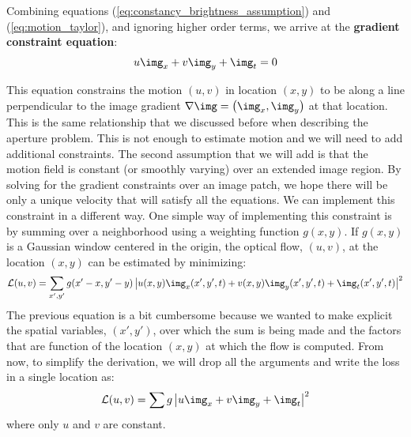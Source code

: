 Combining equations (\ref{eq:constancy_brightness_assumption}) and (\ref{eq:motion_taylor}), and ignoring higher order terms, we arrive at the {\bf gradient constraint equation}: 
\begin{equation}
u \img_x  + v \img_y + \img_t  = 0
\end{equation}

This equation constrains the motion $(u,v)$ in location $(x,y)$ to be along a line perpendicular to the image gradient  
$\nabla \img = \left( \img_x, \img_y \right)$ 
at that location. This is the same relationship that we discussed before when describing the aperture problem. This is not enough to estimate motion and we will need to add additional constraints. The second assumption that we will add is that the motion field is constant (or smoothly varying) over an extended image region. By solving for the gradient constraints over an image patch, we hope there will be only a unique velocity that will satisfy all the equations. We can implement this constraint in a different way. One simple way of implementing this constraint is by summing over a neighborhood using a weighting function $g(x,y)$.
If $g(x,y)$ is a Gaussian window centered in the origin, the optical flow, $(u,v)$, at the location $(x,y)$ can be estimated by minimizing: 
\begin{equation}
\mathcal{L}(u, v) = \sum_{x',y'} g(x'-x,y'-y) \left| u(x,y) \img_x (x',y',t) + v(x,y) \img_y(x',y',t) + \img_t(x',y',t) \right| ^2
\end{equation}
The previous equation is a bit cumbersome because we wanted to make explicit the spatial variables, $(x',y')$, over which the sum is being made and the factors that are function of the location $(x,y)$ at which the flow is computed. From now, to simplify the derivation, we will drop all the arguments and write the loss in a single location as:
\begin{equation}
\mathcal{L}(u, v) = \sum g \left| u \img_x  + v \img_y + \img_t \right| ^2
\end{equation}
where only $u$ and $v$ are constant. 

